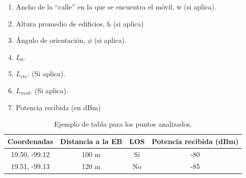 \begin{enumerate}
\begin{enumerate}
            \item Ancho de la “calle” en la que se encuentra el móvil, w (si aplica). 
            \item Altura promedio de edificios, h (si aplica) 
            \item Ángulo de orientación, $\phi$ (si aplica).
            \item $L_0.$
            \item $L_{rts}$. (Si aplica).
            \item $L_{msd}$. (Si aplica).
            \item Potencia recibida (en dBm) 
          \end{enumerate}
                \begin{table}[H]
                \centering
                \begin{tabular}{|c|c|c|c|}
                    \hline
                    Coordenadas & Distancia a la EB & LOS & Potencia recibida (dBm) \\
                    \hline
                    19.50, -99.12 & 100 m & Sí & -80 \\
                    19.51, -99.13 & 120 m & No & -85 \\
                    \hline
                \end{tabular}
                \caption{Ejemplo de tabla para los puntos analizados.}
                \label{tab:ejemplo}
            \end{table}          


\end{enumerate}